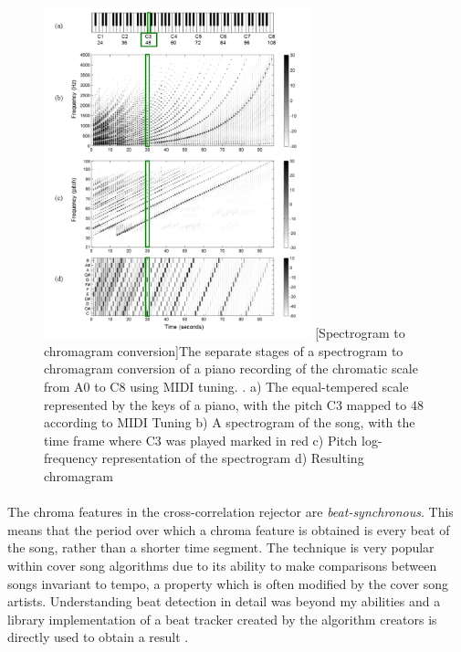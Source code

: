 \begin{figure}[H]
    \centering
    \includegraphics[width=0.69\textwidth]{Algorithms/spectrogram_to_chromagram.png}
    [Spectrogram to chromagram conversion]{The separate stages of a spectrogram to chromagram conversion of a piano recording of the chromatic scale from A0 to C8 using MIDI tuning. \cite{mullershort}. a) The equal-tempered scale represented by the keys of a piano, with the pitch C3 mapped to 48 according to MIDI Tuning b) A spectrogram of the song, with the time frame where C3 was played marked in red c) Pitch log-frequency representation of the spectrogram d) Resulting chromagram}
    \label{fig:spectrotochroma}
\end{figure}

\paragraph{}
The chroma features in the cross-correlation rejector are
\textit{beat-synchronous}. This means that the period over which a chroma
feature is obtained is every beat of the song, rather than a shorter time
segment. The technique is very popular within cover song algorithms due to its
ability to make comparisons between songs invariant to tempo, a property which
is often modified by the cover song artists. Understanding beat detection in
detail was beyond my abilities and a library implementation of a beat tracker
created by the algorithm creators is directly used to obtain a result
\cite{librosa_beat}.

